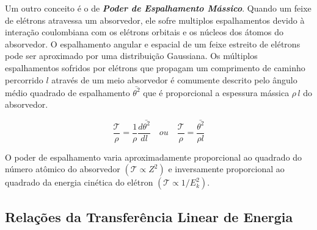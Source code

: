 \documentclass[11pt,a4paper]{article}
\begin{document}
            Um outro conceito é o de \textbf{\textit{\textcolor{CarnationPink}{Poder de Espalhamento Mássico}}}. Quando um feixe de elétrons atravessa um absorvedor, ele sofre multiplos espalhamentos devido à interação coulombiana com os elétrons orbitais e os núcleos dos átomos do absorvedor. O espalhamento angular e espacial de um feixe estreito de elétrons pode ser aproximado por uma distribuição Gaussiana. Os múltiplos espalhamentos sofridos por elétrons que propagam um comprimento de caminho percorrido $l$ através de um meio absorvedor é comumente descrito pelo ângulo médio quadrado de espalhamento $\bar{\theta^2}$ que é proporcional a espessura mássica $\rho\,l$ do absorvedor.

                \begin{equation}
                    \frac{\mathcal{T} }{\rho} = \frac{1}{\rho} \frac{d \bar{\theta^2}}{d l}
                    \quad
                    ou
                    \quad
                    \frac{\mathcal{T} }{\rho} = \frac{\bar{\theta^2}}{\rho l}
                \end{equation}

            O poder de espalhamento varia aproximadamente proporcional ao quadrado do número atômico do absorvedor $(\mathcal{T} \propto Z^2)$ e inversamente proporcional ao quadrado da energia cinética do elétron $(\mathcal{T} \propto 1/E_k^2)$. 
            
        \subsection{Relações da Transferência Linear de Energia}
\end{document}
